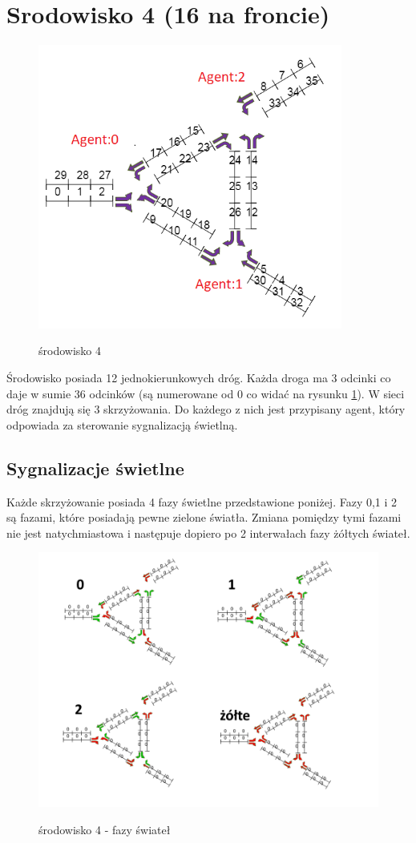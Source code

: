 \documentclass[12pt]{book}
\theoremstyle{plain}
\begin{document}
\section{Srodowisko 4 (16 na froncie)}
\begin{figure}[H]
	\centering
	\includegraphics[width=10cm]{env_4_agenci}
	\label{fig:env_4_agenci}
	\caption{środowisko 4}
\end{figure}

Środowisko posiada 12 jednokierunkowych dróg. Każda droga ma 3 odcinki co daje w sumie 36 odcinków (są numerowane od 0 co widać na rysunku \ref{fig:env_4_agenci}).
W sieci dróg znajdują się 3 skrzyżowania. Do każdego z nich jest przypisany agent, który odpowiada za sterowanie sygnalizacją świetlną.
\subsection{Sygnalizacje świetlne}
Każde skrzyżowanie posiada 4 fazy świetlne przedstawione poniżej. Fazy 0,1 i 2 są fazami, które posiadają pewne zielone światła. Zmiana pomiędzy tymi fazami nie jest natychmiastowa i następuje dopiero po 2 interwałach fazy żółtych świateł.
\begin{figure}[H]
	\centering
	\includegraphics[width=14cm]{env_4_fazy}
	\label{fig:env_4_fazy}
	\caption{środowisko 4 - fazy świateł}
\end{figure}
\end{document}
